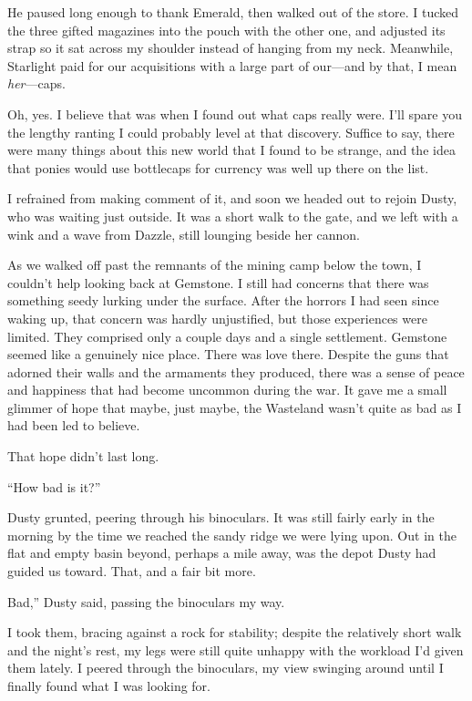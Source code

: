 He paused long enough to thank Emerald, then walked out of the store. I tucked the three gifted magazines into the pouch with the other one, and adjusted its strap so it sat across my shoulder instead of hanging from my neck. Meanwhile, Starlight paid for our acquisitions with a large part of our—and by that, I mean \textit{her}—caps.

Oh, yes. I believe that was when I found out what caps really were. I’ll spare you the lengthy ranting I could probably level at that discovery. Suffice to say, there were many things about this new world that I found to be strange, and the idea that ponies would use bottlecaps for currency was well up there on the list.

I refrained from making comment of it, and soon we headed out to rejoin Dusty, who was waiting just outside. It was a short walk to the gate, and we left with a wink and a wave from Dazzle, still lounging beside her cannon.

As we walked off past the remnants of the mining camp below the town, I couldn’t help looking back at Gemstone. I still had concerns that there was something seedy lurking under the surface. After the horrors I had seen since waking up, that concern was hardly unjustified, but those experiences were limited. They comprised only a couple days and a single settlement. Gemstone seemed like a genuinely nice place. There was love there. Despite the guns that adorned their walls and the armaments they produced, there was a sense of peace and happiness that had become uncommon during the war. It gave me a small glimmer of hope that maybe, just maybe, the Wasteland wasn’t quite as bad as I had been led to believe.

That hope didn’t last long.

{\br}%
“How bad is it?”

Dusty grunted, peering through his binoculars. It was still fairly early in the morning by the time we reached the sandy ridge we were lying upon. Out in the flat and empty basin beyond, perhaps a mile away, was the depot Dusty had guided us toward. That, and a fair bit more.

\leavevmode{}Bad,” Dusty said, passing the binoculars my way.

I took them, bracing against a rock for stability; despite the relatively short walk and the night’s rest, my legs were still quite unhappy with the workload I’d given them lately. I peered through the binoculars, my view swinging around until I finally found what I was looking for.

